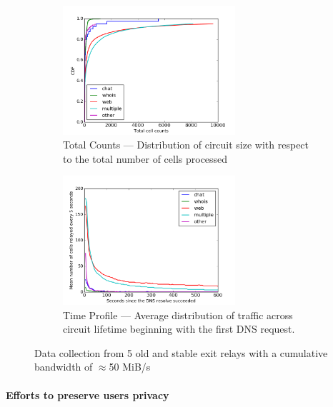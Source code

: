 \begin{figure}[t] \centering
  \begin{subfigure}[t]{0.47\textwidth} \centering\centering
    \includegraphics[width=0.7\textwidth]{images/totcellcountscdf.png}
    \caption{Total Counts --- Distribution of circuit size with respect to the total number of cells processed}
    \label{fig:statsb}
  \end{subfigure}
  \begin{subfigure}[t]{0.47\textwidth} \centering
    \includegraphics[width=0.7\textwidth]{images/exitmeasurement.png}
    \caption{Time Profile --- Average distribution of traffic across circuit lifetime beginning with the first DNS request.}
    \label{fig:statsa}
  \end{subfigure}
  \caption{Data collection from 5 old and stable exit relays with a cumulative bandwidth of $\approx$50 MiB/s}
  \label{fig:stats}
\end{figure}

\paragraph*{Efforts to preserve users privacy}

